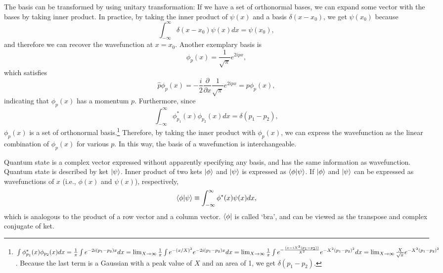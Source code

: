 The basis can be transformed by using unitary transformation: If we have a set of orthonormal bases, we can expand some vector with the bases by taking inner product.
In practice, by taking the inner product of $\psi(x)$ and a basis $\delta(x-x_0)$, we get $\psi(x_0)$ because
\begin{equation}
  \int_{-\infty}^{\infty}\delta(x-x_0)\psi(x)dx = \psi(x_0),
  \label{eq:delta_function_2}
\end{equation}
and therefore we can recover the wavefunction at $x = x_0$. Another exemplary basis is
\begin{equation}
  \phi_p(x) = \frac {1}{\sqrt{\pi}} e^{2ipx},
\end{equation}
which satisfies 
\begin{equation}
  \hat p \phi_p(x) = -\frac{i}{2}\frac{\partial}{\partial x} \frac{1}{\sqrt\pi}e^{2ipx} = p \phi_p(x),
\end{equation}
indicating that $\phi_p(x)$ has a momentum $p$. Furthermore, since
\begin{equation}
  \int_{-\infty}^{\infty}\phi_{p_1}^*(x)\phi_{p_2}(x)dx = \delta(p_1 - p_2),
\end{equation}
$\phi_p(x)$ is a set of orthonormal basis.\footnote{$\int\phi_{p_1}^*(x)\phi_{p_2}(x)dx = \frac 1 \pi \int e^{-2i(p_1-p_2)x}dx = \lim_{X\to\infty}\frac 1 \pi \int e^{-(x/X)^2}e^{-2i(p_1-p_2)x}dx\\= \lim_{X\to\infty}\frac 1 \pi \int e^{-\frac{(x-iX^2(p_1-p_2))}{X^2}}e^{-X^2(p_1-p_2)^2}dx = \lim_{X\to\infty}\frac X {\sqrt \pi}e^{-X^2(p_1-p_2)^2}$. Because the last term is a Gaussian with a peak value of $X$ and an area of 1, we get $\delta(p_1-p_2)$.}
Therefore, by taking the inner product with $\phi_p(x)$, we can express the wavefunction as the linear combination of $\phi_p(x)$ for various $p$. In this way, the basis of a wavefunction is interchangeable. 

Quantum state is a complex vector expressed without apparently specifying any basis, and has the same information as wavefunction. Quantum state is described by ket $\ket \psi$. Inner product of two kets $\ket \phi$ and $\ket \psi$ is expressed as $\braket{\phi|\psi}$. If $\ket \phi$ and $\ket \psi$ can be expressed as wavefunctions of $x$ (i.e., $\phi(x)$ and $\psi(x)$), respectively, 
\begin{equation}
  \braket{\phi|\psi} \equiv \int_{-\infty}^{\infty}\phi^*(x)\psi(x)dx,
\end{equation}
which is analogous to the product of a row vector and a column vector. $\bra \phi$ is called `bra', and can be viewed as the transpose and complex conjugate of ket.

